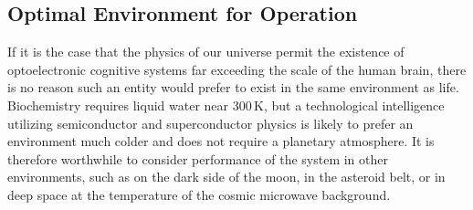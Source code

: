 \subsection{Optimal Environment for Operation}
If it is the case that the physics of our universe permit the existence of optoelectronic cognitive systems far exceeding the scale of the human brain, there is no reason such an entity would prefer to exist in the same environment as life. Biochemistry requires liquid water near 300\,K, but a technological intelligence utilizing semiconductor and superconductor physics is likely to prefer an environment much colder and does not require a planetary atmosphere. It is therefore worthwhile to consider performance of the system in other environments, such as on the dark side of the moon, in the asteroid belt, or in deep space at the temperature of the cosmic microwave background. 